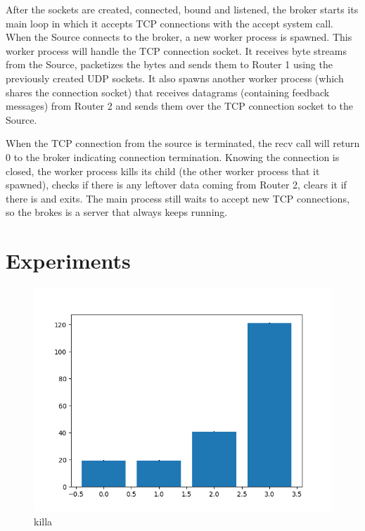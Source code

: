 \documentclass[conference]{IEEEtran}
\begin{document}
After the sockets are created, connected, bound and listened, the broker starts
its main loop in which it accepts TCP connections with the accept system call.
When the Source connects to the broker, a new worker process is spawned. This worker
process will handle the TCP connection socket. It receives byte streams from the Source,
packetizes the bytes and sends them to Router 1 using the previously
created UDP sockets. It also spawns another worker process (which shares the connection
socket) that receives datagrams (containing feedback messages) from Router 2 and
sends them over the TCP connection socket to the Source.

When the TCP connection from the source is terminated, the recv call will return 0
to the broker indicating connection termination. Knowing the connection is closed,
the worker process kills its child (the other worker process that it spawned),
checks if there is any leftover data coming from Router 2, clears it if there is
and exits. The main process still waits to accept new TCP connections, so the brokes
is a server that always keeps running.

\section{Experiments}

\begin{figure}
    \centering
    \includegraphics[scale=0.6]{graphics/plt}
    \caption{killa}
\end{figure}
\end{document}
